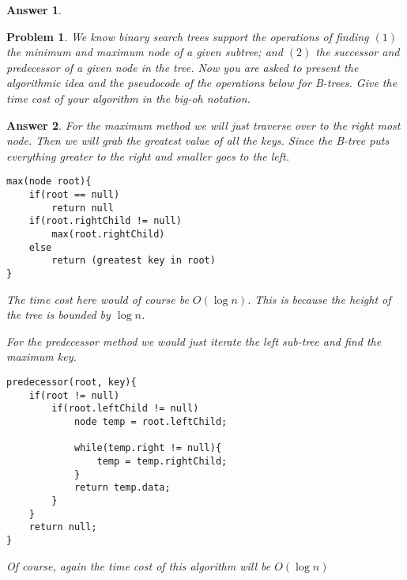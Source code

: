 \documentclass[11pt]{article}
\newtheorem{problem}{Problem}
\newtheorem{answer}{Answer}
\begin{document}
\begin{answer}
\begin{center}

\bigskip
\bigskip


\end{center}
\end{answer}

\bigskip

\begin{problem}
\label{prob:5}
 We know binary search trees support the operations of finding $(1)$ the minimum and maximum node of a given subtree; and $(2)$ the successor and predecessor of a given node in the tree. Now you are asked to present the algorithmic idea and the pseudocode of the operations below for B-trees. Give the time cost of your algorithm in the big-oh notation.
\end{problem}

\begin{answer}
\label{ans:5}
 For the maximum method we will just traverse over to the right most node. Then we will grab the greatest value of all the keys. Since the B-tree puts everything greater to the right and smaller goes to the left.
\begin{lstlisting}
max(node root){
	if(root == null)
		return null
	if(root.rightChild != null)
		max(root.rightChild)
	else
		return (greatest key in root)
}	 
\end{lstlisting}
 The time cost here would of course be $O(\log{n})$. This is because the height of the tree is bounded by $\log{n}$.
 
\bigskip

 For the predecessor method we would just iterate the left sub-tree and find the maximum key.
 
\begin{lstlisting}
predecessor(root, key){
	if(root != null)
		if(root.leftChild != null)
			node temp = root.leftChild;
			
			while(temp.right != null){
				temp = temp.rightChild;
			}
			return temp.data;
		}
	}
	return null;
}
\end{lstlisting}
Of course, again the time cost of this algorithm will be $O(\log{n})$
\end{answer}
\end{document}
